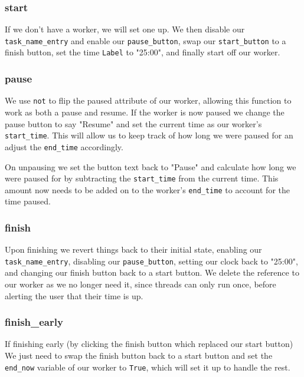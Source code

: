 \documentclass[a4paper,11pt,openany]{book}
\begin{document}
\subsubsection{start}

If we don't have a worker, we will set one up. We then disable our \lstinline[columns=fixed]{task_name_entry} and enable our \lstinline[columns=fixed]{pause_button}, swap our \lstinline[columns=fixed]{start_button} to a finish button, set the time \lstinline[columns=fixed]{Label} to "25:00", and finally start off our worker. 

\subsubsection{pause}

We use \lstinline[columns=fixed]{not} to flip the paused attribute of our worker, allowing this function to work as both a pause and resume. If the worker is now paused we change the pause button to say "Resume" and set the current time as our worker's \lstinline[columns=fixed]{start_time}. This will allow us to keep track of how long we were paused for an adjust the \lstinline[columns=fixed]{end_time} accordingly.

\vspace{5mm}

On unpausing we set the button text back to "Pause" and calculate how long we were paused for by subtracting the \lstinline[columns=fixed]{start_time} from the current time. This amount now needs to be added on to the worker's \lstinline[columns=fixed]{end_time} to account for the time paused. 

\subsubsection{finish}

Upon finishing we revert things back to their initial state, enabling our \lstinline[columns=fixed]{task_name_entry}, disabling our \lstinline[columns=fixed]{pause_button}, setting our clock back to "25:00", and changing our finish button back to a start button. We delete the reference to our worker as we no longer need it, since threads can only run once, before alerting the user that their time is up.

\subsubsection{finish\_early}
If finishing early (by clicking the finish button which replaced our start button) We just need to swap the finish button back to a start button and set the \lstinline[columns=fixed]{end_now} variable of our worker to \lstinline[columns=fixed]{True}, which will set it up to handle the rest. 
\end{document}
